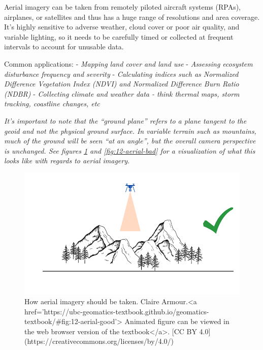 \documentclass[
]{book}
\begin{document}
Aerial imagery can be taken from remotely piloted aircraft systems (RPAs), airplanes, or satellites and thus has a huge range of resolutions and area coverage. It's highly sensitive to adverse weather, cloud cover or poor air quality, and variable lighting, so it needs to be carefully timed or collected at frequent intervals to account for unusable data.

Common applications:
- \emph{Mapping land cover and land use}
- \emph{Assessing ecosystem disturbance frequency and severity}
- \emph{Calculating indices such as Normalized Difference Vegetation Index (NDVI) and Normalized Difference Burn Ratio (NDBR)}
- \emph{Collecting climate and weather data - think thermal maps, storm tracking, coastline changes, etc}

\emph{It's important to note that the ``ground plane'' refers to a plane tangent to the geoid and not the physical ground surface. In variable terrain such as mountains, much of the ground will be seen ``at an angle'', but the overall camera perspective is unchanged. See figures \ref{fig:12-aerial-good} and \ref{fig:12-aerial-bad} for a visualization of what this looks like with regards to aerial imagery.}

\begin{figure}
\includegraphics[width=0.9\linewidth]{images/12-aerial-good} \caption{How aerial imagery should be taken. Claire Armour.<a href='https://ubc-geomatics-textbook.github.io/geomatics-textbook/#fig:12-aerial-good'> Animated figure can be viewed in the web browser version of the textbook</a>. [CC BY 4.0](https://creativecommons.org/licenses/by/4.0/)}\label{fig:12-aerial-good}
\end{figure}
\end{document}
